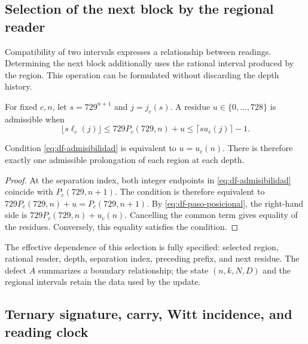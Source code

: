 \subsection{Selection of the next block by the regional reader}

Compatibility of two intervals expresses a relationship between readings.
Determining the next block additionally uses the rational interval
produced by the region. This operation can be formulated without
discarding the depth history.

\begin{definition}
For fixed \(c,n\), let \(s=729^{n+1}\) and \(j=j_c(s)\). A residue
\(u\in\{0,\ldots,728\}\) is admissible when
\begin{equation}
 \lfloor s\ell_c(j)\rfloor
 \leq729P_c(729,n)+u
 \leq\lceil su_c(j)\rceil-1.
 \label{eq:df-admisibilidad}
\end{equation}
\end{definition}

\begin{theorem}
\label{thm:df-prolongacion-unica}
Condition \eqref{eq:df-admisibilidad} is equivalent to \(u=u_c(n)\).
There is therefore exactly one admissible prolongation of each region
at each depth.
\end{theorem}

\begin{proof}
At the separation index, both integer endpoints in
\eqref{eq:df-admisibilidad} coincide with \(P_c(729,n+1)\).
The condition is therefore equivalent to
\(729P_c(729,n)+u=P_c(729,n+1)\).
By \eqref{eq:df-paso-posicional}, the right-hand side is
\(729P_c(729,n)+u_c(n)\). Cancelling the common term gives equality
of the residues. Conversely, this equality satisfies the condition.
\end{proof}

The effective dependence of this selection is fully specified:
selected region, rational reader, depth, separation index, preceding
prefix, and next residue. The defect \(A\) summarizes a boundary
relationship; the state \((n,k,N,D)\) and the regional intervals retain
the data used by the update.

\subsection{Ternary signature, carry, Witt incidence, and reading clock}
\label{subsec:df-firma-conjunta}

